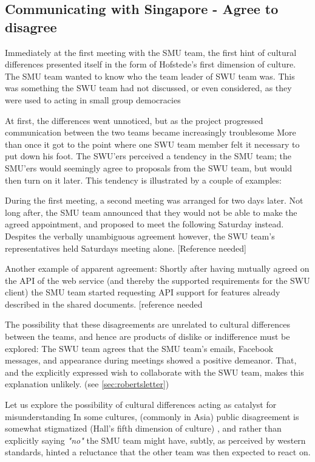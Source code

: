 \subsection{Communicating with Singapore - Agree to disagree}
\label{sec:communicating}

Immediately at the first meeting with the SMU team, the  first hint of cultural
differences presented itself in the form of Hofstede's first
dimension of culture\cite{surprises}. The SMU team wanted to know who the team leader of SWU team was.
This was something the SWU team had not discussed, or even considered, as they
were used to acting in small group democracies

At first, the differences went unnoticed, but as the project progressed
communication between the two teams became increasingly troublesome
More than once it got to the point where one SWU team member felt it necessary
to put down his foot\cite{enough}.
The SWU'ers perceived a tendency in the SMU team; the SMU'ers would seemingly
agree to proposals from the SWU team, but would then turn on it later.
This tendency is illustrated by a couple of examples:

During the first meeting, a second meeting was arranged for two
days later. Not long after, the SMU team announced that they would
not be able to make the agreed appointment, and proposed to meet the following
Saturday instead. Despites the verbally unambiguous agreement however,
the SWU team's representatives held Saturdays meeting alone. [Reference needed]

Another example of apparent agreement:
Shortly after having mutually agreed on the API of the web
service (and thereby the supported requirements for the SWU client)
the SMU team started requesting API support for features already
described in the shared documents. [reference needed

The possibility that these disagreements are unrelated to cultural
differences between the teams, and hence are products of dislike or
indifference must be explored: The SWU team agrees that the SMU team's emails, Facebook
messages, and appearance during meetings showed a positive demeanor. That, and
the explicitly expressed wish to collaborate with the SWU team, makes this
explanation unlikely. (see \ref{sec:robertsletter})

Let us explore the possibility of cultural differences acting as catalyst for
misunderstanding
In some cultures, (commonly in Asia) public
disagreement is somewhat stigmatized (Hall's fifth dimension of
culture\cite{surprises}) \cite{herbsiemens}, and rather
than explicitly saying \emph{"no"} the SMU team might have, subtly,
as perceived by western standards, hinted a reluctance
that the other team was then expected to react on.

